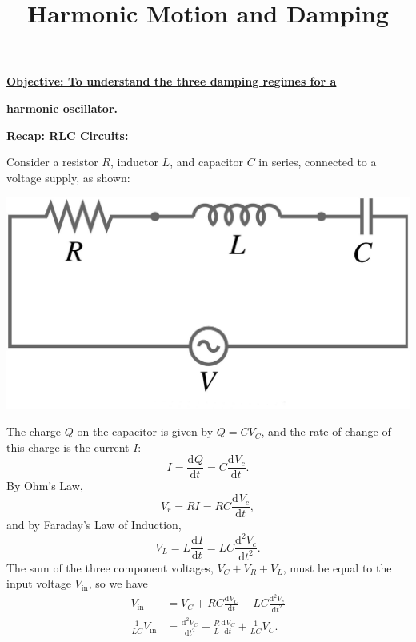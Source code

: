 \documentclass{article}
\newcommand{\deriv}[3][]{\frac{\mathrm{d}^{#1}#2}{\mathrm{d}#3^{#1}}}
\begin{document}
\title{Harmonic Motion and Damping}
\date{}

\maketitle
\thispagestyle{empty}

\Large

\vskip -10mm

\textbf{\underline{Objective: To understand the three damping regimes for a}}

\textbf{\underline{harmonic oscillator.}}



\vspace{5mm}



\textbf{Recap: RLC Circuits:}\bigskip


Consider a resistor $R$, inductor $L$, and capacitor $C$ in series, connected to a voltage supply, as shown:

\begin{center}
	\includegraphics[scale=0.4]{RLC_series_circuit.jpg}
\end{center}

The charge $Q$ on the capacitor is given by $Q=CV_C$, and the rate of change of this charge is the current $I$:
\[I=\deriv{Q}{t}=C\deriv{V_c}{t}.\]
By Ohm's Law,
\[V_r=RI=RC\deriv{V_c}{t},\]
and by Faraday's Law of Induction,
\[V_L=L\deriv{I}{t}=LC\deriv[2]{V_c}{t}.\]
The sum of the three component voltages, $V_C+V_R+V_L$, must be equal to the input voltage $V_\mathrm{in}$, so we have
\begin{align*}
	V_\mathrm{in}&=V_C+RC\deriv{V_C}{t}+LC\deriv[2]{V_c}{t}\\
	\frac{1}{LC}V_\mathrm{in}&=\deriv[2]{V_C}{t} + \frac{R}{L}\deriv{V_C}{t} + \frac{1}{LC}V_C.
\end{align*}
\end{document}
